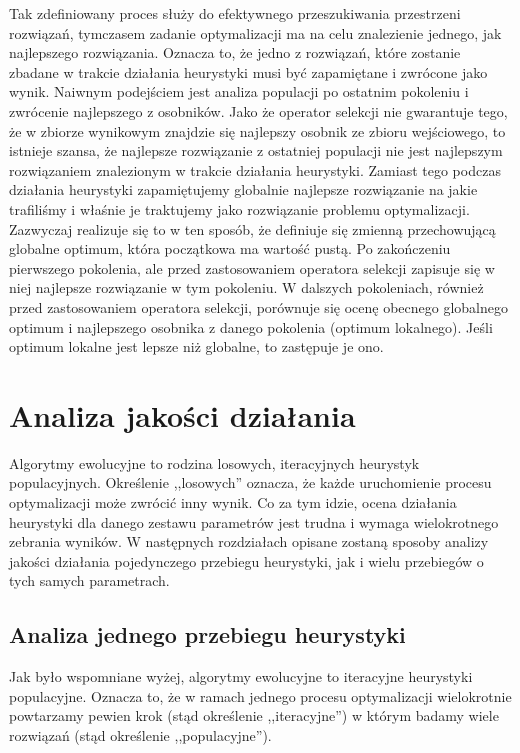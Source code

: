 \documentclass[twoside]{iisthesis}
\begin{document}
Tak zdefiniowany proces służy do efektywnego przeszukiwania przestrzeni rozwiązań, tymczasem zadanie optymalizacji ma na celu znalezienie jednego, jak najlepszego rozwiązania. Oznacza to, że jedno z rozwiązań, które zostanie zbadane w trakcie działania heurystyki musi być zapamiętane i zwrócone jako wynik. Naiwnym podejściem jest analiza populacji po ostatnim pokoleniu i zwrócenie najlepszego z osobników. Jako że operator selekcji nie gwarantuje tego, że w zbiorze wynikowym znajdzie się najlepszy osobnik ze zbioru wejściowego, to istnieje szansa, że najlepsze rozwiązanie z ostatniej populacji nie jest najlepszym rozwiązaniem znalezionym w trakcie działania heurystyki. Zamiast tego podczas działania heurystyki zapamiętujemy globalnie najlepsze rozwiązanie na jakie trafiliśmy i właśnie je traktujemy jako rozwiązanie problemu optymalizacji. Zazwyczaj realizuje się to w ten sposób, że definiuje się zmienną przechowującą globalne optimum, która początkowa ma wartość pustą. Po zakończeniu pierwszego pokolenia, ale przed zastosowaniem operatora selekcji zapisuje się w niej najlepsze rozwiązanie w tym pokoleniu. W dalszych pokoleniach, również przed zastosowaniem operatora selekcji, porównuje się ocenę obecnego globalnego optimum i najlepszego osobnika z danego pokolenia (optimum lokalnego). Jeśli optimum lokalne jest lepsze niż globalne, to zastępuje je ono.

\section{Analiza jakości działania}

Algorytmy ewolucyjne to rodzina losowych, iteracyjnych heurystyk populacyjnych. Określenie ,,losowych'' oznacza, że każde uruchomienie procesu optymalizacji może zwrócić inny wynik. Co za tym idzie, ocena działania heurystyki dla danego zestawu parametrów jest trudna i wymaga wielokrotnego zebrania wyników. W następnych rozdziałach opisane zostaną sposoby analizy jakości działania pojedynczego przebiegu heurystyki, jak i wielu przebiegów o tych samych parametrach.

\subsection{Analiza jednego przebiegu heurystyki}

Jak było wspomniane wyżej, algorytmy ewolucyjne to iteracyjne heurystyki populacyjne. Oznacza to, że w ramach jednego procesu optymalizacji wielokrotnie powtarzamy pewien krok (stąd określenie ,,iteracyjne'') w którym badamy wiele rozwiązań (stąd określenie ,,populacyjne'').
\end{document}
